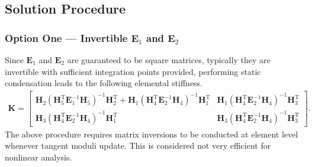 \documentclass[3p,sort&compress,11pt,fleqn]{elsarticle}
\newcommand*{\mT}{\mathrm{T}}
\begin{document}
\subsection{Solution Procedure}
\subsubsection{Option One --- Invertible $\mathbold{E}_1$ and $\mathbold{E}_2$}
Since $\mathbold{E}_1$ and $\mathbold{E}_2$ are guaranteed to be square matrices, typically they are invertible with sufficient integration points provided, performing static condensation leads to the following elemental stiffness.
\begin{gather}
\mathbold{K}=
\begin{bmatrix}
\mathbold{H}_2\left(\mathbold{H}_5^\mT\mathbold{E}_1^{-1}\mathbold{H}_5\right)^{-1}\mathbold{H}_2^\mT+\mathbold{H}_1\left(\mathbold{H}_4^\mT\mathbold{E}_2^{-1}\mathbold{H}_4\right)^{-1}\mathbold{H}_1^\mT&\mathbold{H}_1\left(\mathbold{H}_4^\mT\mathbold{E}_2^{-1}\mathbold{H}_4\right)^{-1}\mathbold{H}_3^\mT\\
\mathbold{H}_3\left(\mathbold{H}_4^\mT\mathbold{E}_2^{-1}\mathbold{H}_4\right)^{-1}\mathbold{H}_1^\mT&\mathbold{H}_3\left(\mathbold{H}_4^\mT\mathbold{E}_2^{-1}\mathbold{H}_4\right)^{-1}\mathbold{H}_3^\mT
\end{bmatrix}.
\end{gather}
The above procedure requires matrix inversions to be conducted at element level whenever tangent moduli update. This is considered not very efficient for nonlinear analysis.
\end{document}
